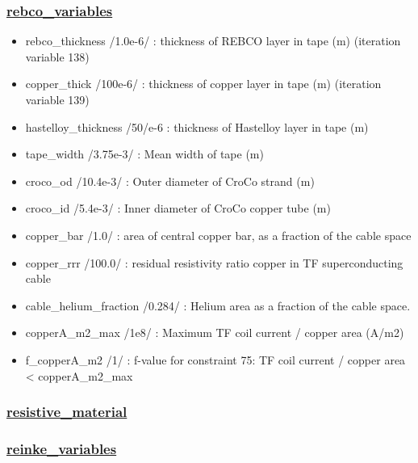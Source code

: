 \documentclass[
]{article}
\providecommand{\tightlist}{%
  \setlength{\itemsep}{0pt}\setlength{\parskip}{0pt}}
\begin{document}
\begin{itemize}
  \hypertarget{rebco_variables}{%
  \subsubsection{\texorpdfstring{\href{rebco_variables.html}{rebco\_variables}}{rebco\_variables}}\label{rebco_variables}}

  \begin{itemize}
  \tightlist
  \item
    rebco\_thickness /1.0e-6/ : thickness of REBCO layer in tape (m)
    (iteration variable 138)
  \item
    copper\_thick /100e-6/ : thickness of copper layer in tape (m)
    (iteration variable 139)
  \item
    hastelloy\_thickness /50/e-6 : thickness of Hastelloy layer in tape
    (m)
  \item
    tape\_width /3.75e-3/ : Mean width of tape (m)
  \item
    croco\_od /10.4e-3/ : Outer diameter of CroCo strand (m)
  \item
    croco\_id /5.4e-3/ : Inner diameter of CroCo copper tube (m)
  \item
    copper\_bar /1.0/ : area of central copper bar, as a fraction of the
    cable space
  \item
    copper\_rrr /100.0/ : residual resistivity ratio copper in TF
    superconducting cable
  \item
    cable\_helium\_fraction /0.284/ : Helium area as a fraction of the
    cable space.
  \item
    copperA\_m2\_max /1e8/ : Maximum TF coil current / copper area
    (A/m2)
  \item
    f\_copperA\_m2 /1/ : f-value for constraint 75: TF coil current /
    copper area \textless{} copperA\_m2\_max
  \end{itemize}

  \hypertarget{resistive_material}{%
  \subsubsection{\texorpdfstring{\href{resistive_material.html}{resistive\_material}}{resistive\_material}}\label{resistive_material}}

  \hypertarget{reinke_variables}{%
  \subsubsection{\texorpdfstring{\href{reinke_variables.html}{reinke\_variables}}{reinke\_variables}}\label{reinke_variables}}


\end{itemize}
\end{document}
